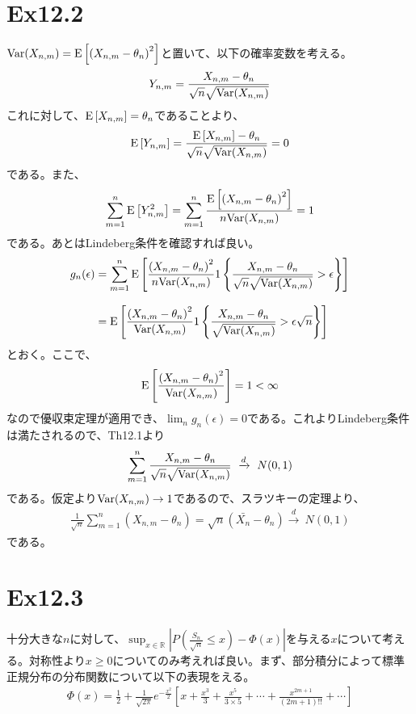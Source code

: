 \documentclass{article}
\begin{document}
\section{Ex12.2}
${\rm Var}(X_{n,m}) = {\rm E}\left[ \left( X_{n,m} - \theta_n \right)^2 \right]$と置いて、以下の確率変数を考える。
\begin{align*}
	Y_{n,m} = \frac{X_{n,m} - \theta_n}{\sqrt{n} \sqrt{{\rm Var}(X_{n,m})}}
\end{align*}
これに対して、${\rm E}\left[ X_{n,m} \right] = \theta_n$であることより、
\begin{align*}
	{\rm E}\left[ Y_{n,m} \right] = \frac{{\rm E}\left[ X_{n,m} \right] - \theta_n}{\sqrt{n} \sqrt{{\rm Var}(X_{n,m})}} = 0
\end{align*}
である。また、
\begin{align*}
	 \sum_{m=1}^n{\rm E}\left[ Y_{n,m}^2 \right] =\sum_{m=1}^n \frac{{\rm E}\left[ \left( X_{n,m} - \theta_n \right)^2 \right]}{n{\rm Var}(X_{n,m})} = 1
\end{align*}
である。あとはLindeberg条件を確認すれば良い。
\begin{align*}
	g_n(\epsilon) &= \sum_{m=1}^n {\rm E} \left[ \frac{ \left( X_{n,m} - \theta_n \right)^2}{n{\rm Var}(X_{n,m})} 1\left\{  \frac{X_{n,m} - \theta_n}{\sqrt{n} \sqrt{{\rm Var}(X_{n,m})}} > \epsilon \right\} \right]\\[8pt]
	&= {\rm E}\left[  \frac{ \left( X_{n,m} - \theta_n \right)^2}{{\rm Var}(X_{n,m})} 1\left\{  \frac{X_{n,m} - \theta_n}{\sqrt{{\rm Var}(X_{n,m})}} > \epsilon \sqrt{n} \right\} \right]
\end{align*}
とおく。ここで、
\begin{align*}
	{\rm E}\left[  \frac{ \left( X_{n,m} - \theta_n \right)^2}{{\rm Var}(X_{n,m})}  \right] = 1 < \infty
\end{align*}
なので優収束定理が適用でき、$\lim_n g_n(\epsilon) = 0$である。これよりLindeberg条件は満たされるので、Th12.1より
\begin{align*}
	\sum_{m=1}^n \frac{X_{n,m} - \theta_n}{\sqrt{n} \sqrt{{\rm Var}(X_{n,m})}}\ \xrightarrow{d}\ N(0,1)
\end{align*}
である。仮定より${\rm Var}(X_{n,m}) \to 1$であるので、スラツキーの定理より、
\begin{align*}
	\frac{1}{\sqrt{n}} \sum_{m=1}^n (X_{n,m} - \theta_n) = \sqrt{n} (\bar{X_n} - \theta_n) \xrightarrow{d}\ N(0,1)
\end{align*}
である。

\section{Ex12.3}
十分大きな$n$に対して、$\sup_{x\in \mathbb{R}} \left| P\left( \frac{S_n}{\sqrt{n}} \leq x \right) - \Phi(x) \right|$を与える$x$について考える。対称性より$x \geq 0$についてのみ考えれば良い。まず、部分積分によって標準正規分布の分布関数について以下の表現をえる。
\begin{align}
	\Phi(x) = \frac{1}{2} + \frac{1}{\sqrt{2\pi}} e^{- \frac{x^2}{2}} \left[ x + \frac{x^3}{3} + \frac{x^5}{3\times 5} + \cdots + \frac{x^{2m+1}}{(2m+1)!!} + \cdots \right]
\end{align}
\end{document}
